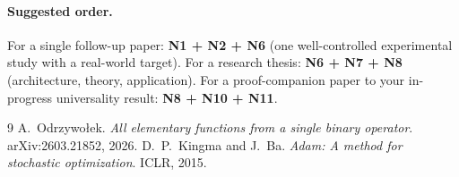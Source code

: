 \documentclass[11pt]{article}
\begin{document}
\paragraph{Suggested order.}
For a single follow-up paper: \textbf{N1 + N2 + N6} (one well-controlled
experimental study with a real-world target). For a research thesis:
\textbf{N6 + N7 + N8} (architecture, theory, application). For a
proof-companion paper to your in-progress universality result:
\textbf{N8 + N10 + N11}.


\begin{thebibliography}{9}
A.~Odrzywo\l{}ek. \emph{All elementary functions from a single binary
operator}. arXiv:2603.21852, 2026.
D.~P.~Kingma and J.~Ba. \emph{Adam: A method for stochastic optimization}.
ICLR, 2015.
\end{thebibliography}
\end{document}
